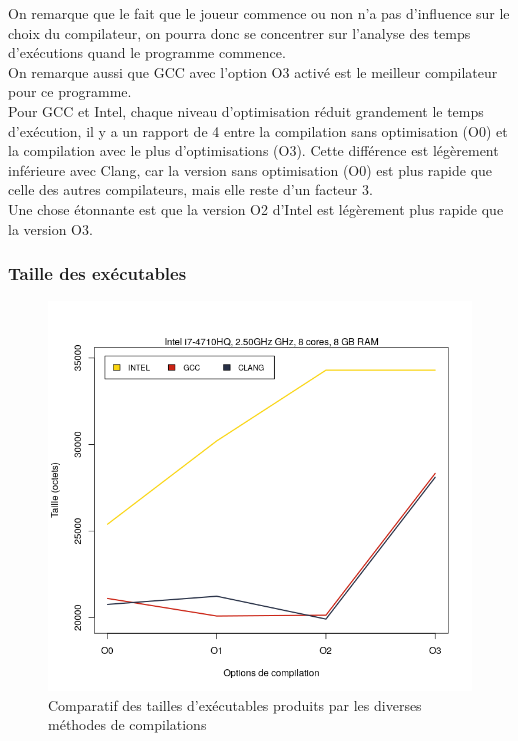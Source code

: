 \documentclass[
 aip,
 jmp,
 amsmath,amssymb,
 reprint
]{revtex4-1}
\begin{document}
On remarque que le fait que le joueur commence ou non n'a pas d'influence sur le choix du compilateur, on pourra donc se concentrer sur l'analyse des temps d'exécutions quand le programme commence.\\
On remarque aussi que GCC avec l'option O3 activé est le meilleur compilateur pour ce programme.\\
Pour GCC et Intel, chaque niveau d'optimisation réduit grandement le temps d'exécution, il y a un rapport de 4 entre la compilation sans optimisation (O0) et la compilation avec le plus d'optimisations (O3). Cette différence est légèrement inférieure avec Clang, car la version sans optimisation (O0) est plus rapide que celle des autres compilateurs, mais elle reste d'un facteur 3.\\
Une chose étonnante est que la version O2 d'Intel est légèrement plus rapide que la version O3.\\

\subsubsection{Taille des exécutables}
\begin{figure}[H]
  \includegraphics[width=\linewidth, keepaspectratio=true]{tailles.png}
  \caption{Comparatif des tailles d'exécutables produits par les diverses méthodes de compilations\label{Fig:taille_executables_seq}}
\end{figure}
\end{document}
